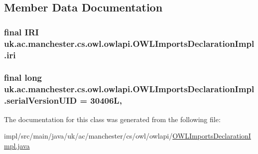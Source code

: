 \subsection{Member Data Documentation}
\hypertarget{classuk_1_1ac_1_1manchester_1_1cs_1_1owl_1_1owlapi_1_1_o_w_l_imports_declaration_impl_abaca9152cc547e7988311b3d1f2dac9e}{
\subsubsection[{iri}]{\setlength{\rightskip}{0pt plus 5cm}final {\bf I\-R\-I} uk.\-ac.\-manchester.\-cs.\-owl.\-owlapi.\-O\-W\-L\-Imports\-Declaration\-Impl.\-iri\hspace{0.3cm}{\ttfamily [private]}}}\label{classuk_1_1ac_1_1manchester_1_1cs_1_1owl_1_1owlapi_1_1_o_w_l_imports_declaration_impl_abaca9152cc547e7988311b3d1f2dac9e}
\hypertarget{classuk_1_1ac_1_1manchester_1_1cs_1_1owl_1_1owlapi_1_1_o_w_l_imports_declaration_impl_a68051cc438b999f00f050d0d7d590baa}{
\subsubsection[{serial\-Version\-U\-I\-D}]{\setlength{\rightskip}{0pt plus 5cm}final long uk.\-ac.\-manchester.\-cs.\-owl.\-owlapi.\-O\-W\-L\-Imports\-Declaration\-Impl.\-serial\-Version\-U\-I\-D = 30406\-L\hspace{0.3cm}{\ttfamily [static]}, {\ttfamily [private]}}}\label{classuk_1_1ac_1_1manchester_1_1cs_1_1owl_1_1owlapi_1_1_o_w_l_imports_declaration_impl_a68051cc438b999f00f050d0d7d590baa}


The documentation for this class was generated from the following file\-:\begin{DoxyCompactItemize}
\item 
impl/src/main/java/uk/ac/manchester/cs/owl/owlapi/\hyperlink{_o_w_l_imports_declaration_impl_8java}{O\-W\-L\-Imports\-Declaration\-Impl.\-java}\end{DoxyCompactItemize}
